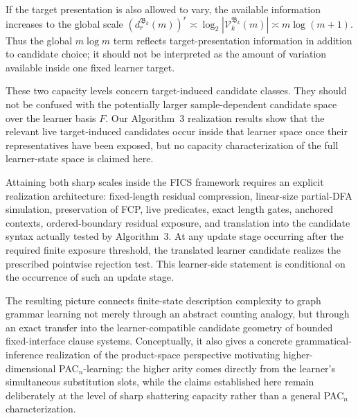 \documentclass[11pt]{article}
\theoremstyle{definition}
\theoremstyle{remark}
\begin{document}
If the target presentation is also allowed to vary, the available information
increases to the global scale
\((d_r^{\mathfrak B_k}(m))^r \asymp \log_2|\mathcal V_k^{\mathfrak B_k}(m)| \asymp m\log(m+1).\)
Thus the global \(m\log m\) term reflects target-presentation information in
addition to candidate choice; it should not be interpreted as the amount of
variation available inside one fixed learner target.

These two capacity levels concern target-induced candidate classes.  They
should not be confused with the potentially larger sample-dependent candidate
space over the learner basis \(F\).  Our Algorithm~3 realization results show
that the relevant live target-induced candidates occur inside that learner
space once their representatives have been exposed, but no capacity
characterization of the full learner-state space is claimed here.

Attaining both sharp scales inside the FICS framework requires an explicit
realization architecture: fixed-length residual compression, linear-size
partial-DFA simulation, preservation of FCP, live predicates, exact length
gates, anchored contexts, ordered-boundary residual exposure, and translation
into the candidate syntax actually tested by Algorithm~3.  At any update stage
occurring after the required finite exposure threshold, the translated learner
candidate realizes the prescribed pointwise rejection test.  This learner-side
statement is conditional on the occurrence of such an update stage.

The resulting picture connects finite-state description complexity to graph
grammar learning not merely through an abstract counting analogy, but through
an exact transfer into the learner-compatible candidate geometry of bounded
fixed-interface clause systems.  Conceptually, it also gives a concrete
grammatical-inference realization of the product-space perspective motivating
higher-dimensional PAC\(_n\)-learning: the higher arity comes directly from the
learner's simultaneous substitution slots, while the claims established here
remain deliberately at the level of sharp shattering capacity rather than a
general PAC\(_n\) characterization.
\end{document}
